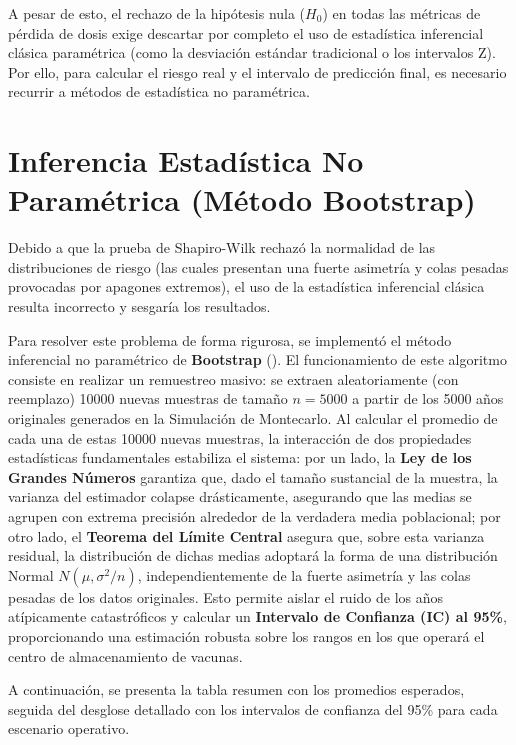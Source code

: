 \documentclass[
  spanish,
  letterpaper,
  DIV=11,
  numbers=noendperiod]{scrreprt}
\theoremstyle{plain}
\theoremstyle{plain}
\theoremstyle{plain}
\theoremstyle{definition}
\theoremstyle{remark}
\begin{document}
A pesar de esto, el rechazo de la hipótesis nula (\(H_0\)) en todas las
métricas de pérdida de dosis exige descartar por completo el uso de
estadística inferencial clásica paramétrica (como la desviación estándar
tradicional o los intervalos Z). Por ello, para calcular el riesgo real
y el intervalo de predicción final, es necesario recurrir a métodos de
estadística no paramétrica.

\section{Inferencia Estadística No Paramétrica (Método
Bootstrap)}\label{inferencia-estaduxedstica-no-paramuxe9trica-muxe9todo-bootstrap}

Debido a que la prueba de Shapiro-Wilk rechazó la normalidad de las
distribuciones de riesgo (las cuales presentan una fuerte asimetría y
colas pesadas provocadas por apagones extremos), el uso de la
estadística inferencial clásica resulta incorrecto y sesgaría los
resultados.

Para resolver este problema de forma rigurosa, se implementó el método
inferencial no paramétrico de \textbf{Bootstrap}
(). El
funcionamiento de este algoritmo consiste en realizar un remuestreo
masivo: se extraen aleatoriamente (con reemplazo) 10000 nuevas muestras
de tamaño \(n = 5000\) a partir de los 5000 años originales generados en
la Simulación de Montecarlo. Al calcular el promedio de cada una de
estas 10000 nuevas muestras, la interacción de dos propiedades
estadísticas fundamentales estabiliza el sistema: por un lado, la
\textbf{Ley de los Grandes Números} garantiza que, dado el tamaño
sustancial de la muestra, la varianza del estimador colapse
drásticamente, asegurando que las medias se agrupen con extrema
precisión alrededor de la verdadera media poblacional; por otro lado, el
\textbf{Teorema del Límite Central} asegura que, sobre esta varianza
residual, la distribución de dichas medias adoptará la forma de una
distribución Normal \(N(\mu, \sigma^2/n)\), independientemente de la
fuerte asimetría y las colas pesadas de los datos originales. Esto
permite aislar el ruido de los años atípicamente catastróficos y
calcular un \textbf{Intervalo de Confianza (IC) al 95\%}, proporcionando
una estimación robusta sobre los rangos en los que operará el centro de
almacenamiento de vacunas.

A continuación, se presenta la tabla resumen con los promedios
esperados, seguida del desglose detallado con los intervalos de
confianza del 95\% para cada escenario operativo.
\end{document}
